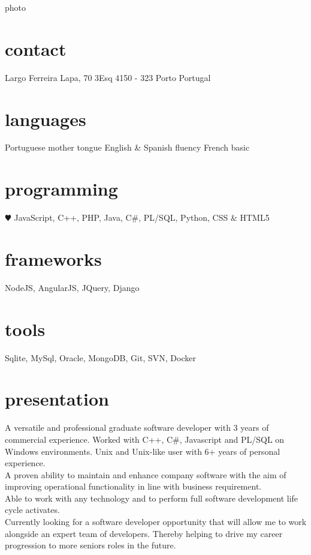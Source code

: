 \documentclass[]{friggeri-cv} %
\begin{document}


\begin{aside}{photo} %
\section{contact}
Largo Ferreira Lapa, 70 3Esq
4150 - 323 Porto
Portugal
~
~
\section{languages}
Portuguese mother tongue
English \& Spanish fluency
French basic
\section{programming}
{\color{red} $\varheartsuit$} JavaScript,
C++, PHP, Java,
C\#, PL/SQL, Python,
CSS \& HTML5
\section{frameworks}
NodeJS, AngularJS,
JQuery, Django
\section{tools}
Sqlite, MySql,
Oracle, MongoDB,
Git, SVN,
Docker
\end{aside}


\section{presentation}
A versatile and professional graduate software developer with 3 years of commercial experience. Worked with C++, C\#, Javascript and PL/SQL on Windows environments. Unix and Unix-like user with 6+ years of personal experience. \\
A proven ability to maintain and enhance company software with the aim of improving operational functionality in line with business requirement. \\
Able to work with any technology and to perform full software development life cycle activates.\\
Currently looking for a software developer opportunity that will allow me to work alongside an expert team of developers. Thereby helping to drive my career progression to more seniors roles in the future.
\end{document}
